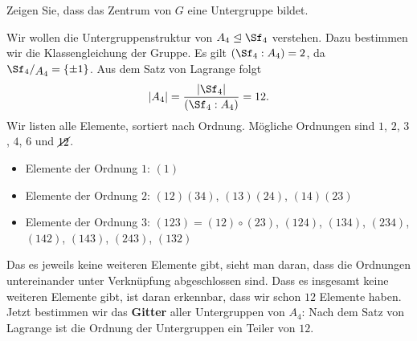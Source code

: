 \begin{übung}
Zeigen Sie, dass das Zentrum von $G$ eine Untergruppe bildet.
\end{übung}
\begin{beispiel}
Wir wollen die Untergruppenstruktur von $A_4 \lnormal \Sf_4$ verstehen. Dazu bestimmen wir die Klassengleichung der Gruppe. Es gilt $(\Sf_4 : A_4)  =2$, da $\quotient{\Sf_4}{A_4} = \{\pm 1\}$. Aus dem Satz von Lagrange folgt 
\begin{equation}
|A_4| = \frac{|\Sf_4|}{(\Sf_4 : A_4)} = 12.
\end{equation}
Wir listen alle Elemente, sortiert nach Ordnung. Mögliche Ordnungen sind $1$, $2$, $3$, $4$, $6$ und $\cancel{12}$.
\begin{itemize}
\item Elemente der Ordnung $1$: $(1)$
\item Elemente der Ordnung $2$: $(12)(34)$, $(13)(24)$, $(14)(23)$
\item Elemente der Ordnung $3$: $(123)=(12)\circ (23)$, $(124)$, $(134)$, $(234)$, $(142)$, $(143)$, $(243)$, $(132)$
\end{itemize}
Das es jeweils keine weiteren Elemente gibt, sieht man daran, dass die Ordnungen untereinander unter Verknüpfung abgeschlossen sind. Dass es insgesamt keine weiteren Elemente gibt, ist daran erkennbar, dass wir schon $12$ Elemente haben.\\
Jetzt bestimmen wir das \textbf{Gitter} aller Untergruppen von $A_4$: Nach dem Satz von Lagrange ist die Ordnung der Untergruppen ein Teiler von $12$.
\begin{center}
\end{center}
\end{beispiel}
